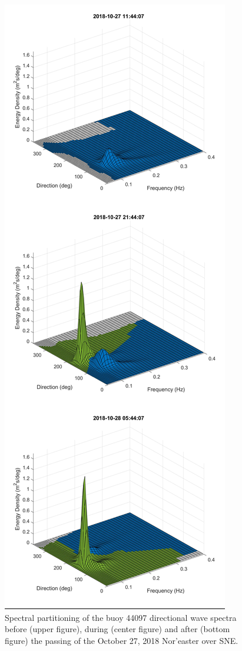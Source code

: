 \begin{figure}[H]
\centering
\includegraphics[width=0.58\linewidth]{Figures/Chapter5/noreaster_oct18_ds.jpg}
\caption{Spectral partitioning of the buoy 44097 directional wave spectra before (upper figure), during (center figure) and after (bottom figure) the passing of the October 27, 2018 Nor'easter over SNE.}
\label{fig:noreaster_oct18_ds}
\end{figure}


